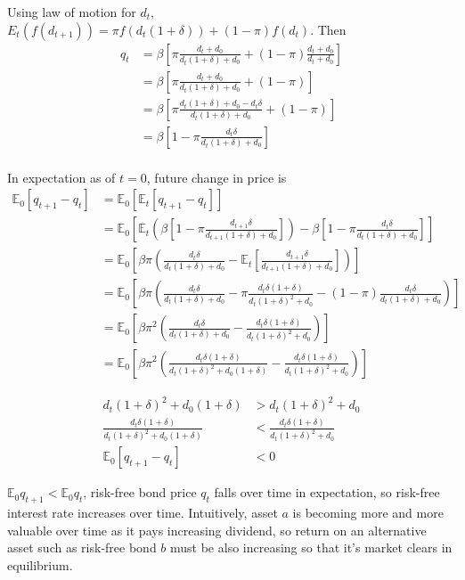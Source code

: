 \documentclass{article}
\newcommand{\E}{\mathbb{E}}
\begin{document}
\begin{enumerate}[(a)]
  Using law of motion for $d_t$,
  $E_t(f(d_{t+1}))=\pi f(d_t(1+\delta))+(1-\pi)f(d_t)$. Then
  \begin{align*}
    q_t&=\beta[\pi\frac{d_t+d_0}{d_{t}(1+\delta)+d_0}+(1-\pi)\frac{d_t+d_0}{d_{t}+d_0}]\\
       &=\beta[\pi\frac{d_t+d_0}{d_{t}(1+\delta)+d_0}+(1-\pi)]\\
       &=\beta[\pi\frac{d_t(1+\delta)+d_0-d_t\delta}{d_{t}(1+\delta)+d_0}+(1-\pi)]\\
       &=\beta[1-\pi\frac{d_t\delta}{d_{t}(1+\delta)+d_0}]\\
  \end{align*}

  In expectation as of $t=0$, future change in price is
  \begin{align*}
    \E_0[q_{t+1}-q_t]&=\E_0\left[\E_t[q_{t+1}-q_t]\right]\\
                     &=\E_0\left[
                       \E_t\left(
                       \beta[1-\pi\frac{d_{t+1}\delta}{d_{t+1}(1+\delta)+d_0}]
                       \right)-
                       \beta[1-\pi\frac{d_t\delta}{d_{t}(1+\delta)+d_0}]
                       \right]\\
                     &=\E_0\left[\beta\pi\left(\frac{d_t\delta}{d_{t}(1+\delta)+d_0}-\E_t[\frac{d_{t+1}\delta}{d_{t+1}(1+\delta)+d_0}]\right)\right]\\
                     &=\E_0\left[\beta\pi\left(\frac{d_t\delta}{d_{t}(1+\delta)+d_0}-\pi\frac{d_{t}\delta(1+\delta)}{d_{t}(1+\delta)^2+d_0}-(1-\pi)\frac{d_{t}\delta}{d_{t}(1+\delta)+d_0}\right)\right]\\
                     &=\E_0\left[\beta\pi^2\left(\frac{d_{t}\delta}{d_{t}(1+\delta)+d_0}-\frac{d_{t}\delta(1+\delta)}{d_{t}(1+\delta)^2+d_0}\right)\right]\\
                     &=\E_0\left[\beta\pi^2\left(\frac{d_{t}\delta(1+\delta)}{d_{t}(1+\delta)^2+d_0(1+\delta)}-\frac{d_{t}\delta(1+\delta)}{d_{t}(1+\delta)^2+d_0}\right)\right]
  \end{align*}
  
  \begin{align*}
  d_{t}(1+\delta)^2+d_0(1+\delta) &> d_{t}(1+\delta)^2+d_0\\
  \frac{d_{t}\delta(1+\delta)}{d_{t}(1+\delta)^2+d_0(1+\delta)}&<\frac{d_{t}\delta(1+\delta)}{d_{t}(1+\delta)^2+d_0}\\
  \E_0[q_{t+1}-q_t]&<0
  \end{align*}

  $\E_0q_{t+1}<\E_0q_t$, risk-free bond price $q_t$ falls over time in
  expectation, so risk-free interest rate increases over
  time. Intuitively, asset $a$ is becoming more and more valuable over
  time as it pays increasing dividend, so return on an alternative
  asset such as risk-free bond $b$ must be also increasing so that
  it's market clears in equilibrium.


\end{enumerate}
\end{document}
